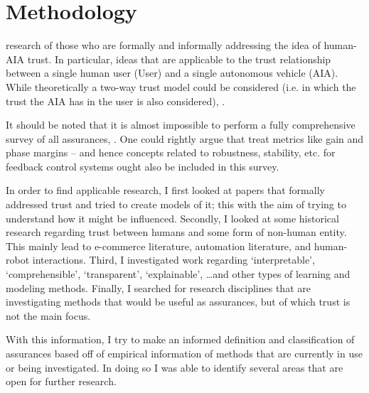 \section{Methodology} \label{sec:methodology}
     research of those who are formally and informally addressing the idea of human-AIA trust. In particular,  ideas that are applicable to the trust relationship between a single human user (User) and a single autonomous vehicle (AIA). While theoretically a two-way trust model could be considered (i.e. in which the trust the AIA has in the user is also considered), . 

    It should be noted that it is almost impossible to perform a fully comprehensive survey of all  assurances, . One could rightly argue that  treat metrics like gain and phase margins  -- and hence concepts related to robustness, stability, etc. for feedback control systems ought also be included in this survey.  

    In order to find applicable research, I first looked at papers that formally addressed trust and tried to create models of it; this with the aim of trying to understand how it might be influenced. Secondly, I looked at some historical research regarding trust between humans and some form of non-human entity. This mainly lead to e-commerce literature, automation literature, and human-robot interactions. Third, I investigated work regarding `interpretable', `comprehensible', `transparent', `explainable', \ldots and other types of learning and modeling methods. Finally, I searched for research disciplines that are investigating methods that would be useful as assurances, but of which trust is not the main focus.

    With this information, I try to make an informed definition and classification of assurances based off of empirical information of methods that are currently in use or being investigated. In doing so I was able to identify several areas that are open for further research. 
